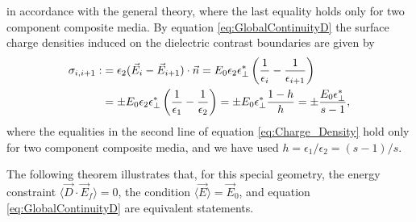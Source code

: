 \documentclass[english,12pt]{ttuthes}
\begin{document}
%
in accordance with the general theory, where the last equality holds
only for two component composite media. By equation
\eqref{eq:GlobalContinuityD} the surface charge densities induced on
the dielectric contrast boundaries are given by 
%
\begin{align}\label{eq:Charge_Density}
  \sigma_{i,i+1}:&=\epsilon_2(\vec{E}_i-\vec{E}_{i+1})\cdot\vec{n}
       =E_0\epsilon_2\epsilon^*_\perp\left(\frac{1}{\epsilon_i}-\frac{1}{\epsilon_{i+1}}\right)\\
       &=\pm E_0\epsilon_2\epsilon^*_\perp\left(\frac{1}{\epsilon_1}-\frac{1}{\epsilon_2}\right)
       =\pm E_0\epsilon^*_\perp\frac{1-h}{h}=\pm\frac{E_0\epsilon^*_\perp}{s-1},\notag
\end{align}
%
where the equalities in the second line of equation
\eqref{eq:Charge_Density} hold only for two component 
composite media, and we have used $h=\epsilon_1/\epsilon_2=(s-1)/s$.

The following theorem illustrates that, for this special geometry, the
energy constraint $\langle\vec{D}\cdot\vec{E}_f\rangle=0$, the condition
$\langle\vec{E}\rangle=\vec{E}_0$, and equation \eqref{eq:GlobalContinuityD} are
equivalent statements.    
\end{document}

